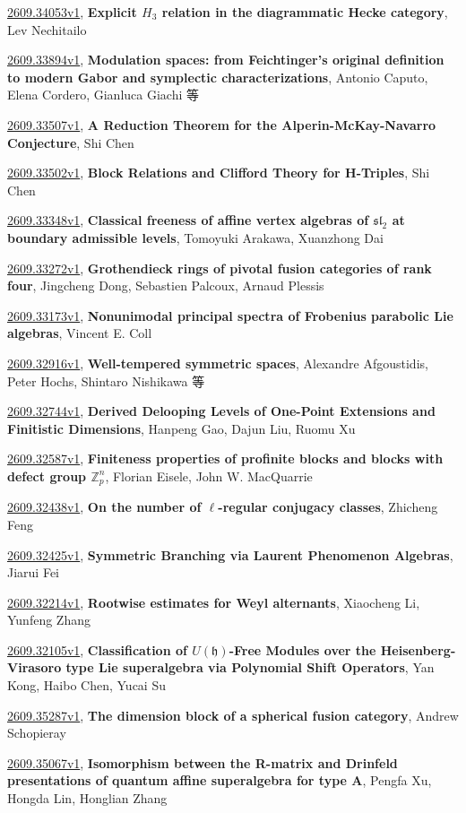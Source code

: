 \documentclass[9pt, a4paper]{article}
\theoremstyle{plain}
\theoremstyle{definition}
\theoremstyle{remark}
\newcommand{\arxiv}[3]{\href{https://arxiv.org/abs/#1}{#1}, \textbf{\textcolor{arxivblue}{#2}}, #3}
\begin{document}
\arxiv{2609.34053v1}{Explicit $H_3$ relation in the diagrammatic Hecke category}{Lev Nechitailo}

\arxiv{2609.33894v1}{Modulation spaces: from Feichtinger's original definition to modern Gabor and symplectic characterizations}{Antonio Caputo, Elena Cordero, Gianluca Giachi 等}

\arxiv{2609.33507v1}{A Reduction Theorem for the Alperin-McKay-Navarro Conjecture}{Shi Chen}

\arxiv{2609.33502v1}{Block Relations and Clifford Theory for H-Triples}{Shi Chen}

\arxiv{2609.33348v1}{Classical freeness of affine vertex algebras of $\mathfrak{sl}_2$ at boundary admissible levels}{Tomoyuki Arakawa, Xuanzhong Dai}

\arxiv{2609.33272v1}{Grothendieck rings of pivotal fusion categories of rank four}{Jingcheng Dong, Sebastien Palcoux, Arnaud Plessis}

\arxiv{2609.33173v1}{Nonunimodal principal spectra of Frobenius parabolic Lie algebras}{Vincent E. Coll}

\arxiv{2609.32916v1}{Well-tempered symmetric spaces}{Alexandre Afgoustidis, Peter Hochs, Shintaro Nishikawa 等}

\arxiv{2609.32744v1}{Derived Delooping Levels of One-Point Extensions and Finitistic Dimensions}{Hanpeng Gao, Dajun Liu, Ruomu Xu}

\arxiv{2609.32587v1}{Finiteness properties of profinite blocks and blocks with defect group $\mathbb Z_p^n$}{Florian Eisele, John W. MacQuarrie}

\arxiv{2609.32438v1}{On the number of $\ell$-regular conjugacy classes}{Zhicheng Feng}

\arxiv{2609.32425v1}{Symmetric Branching via Laurent Phenomenon Algebras}{Jiarui Fei}

\arxiv{2609.32214v1}{Rootwise estimates for Weyl alternants}{Xiaocheng Li, Yunfeng Zhang}

\arxiv{2609.32105v1}{Classification of \(U(\mathfrak h)\)-Free Modules over the Heisenberg-Virasoro type Lie superalgebra via Polynomial Shift Operators}{Yan Kong, Haibo Chen, Yucai Su}

\arxiv{2609.35287v1}{The dimension block of a spherical fusion category}{Andrew Schopieray}

\arxiv{2609.35067v1}{Isomorphism between the R-matrix and Drinfeld presentations of quantum affine superalgebra for type $\boldsymbol{A}$}{Pengfa Xu, Hongda Lin, Honglian Zhang}
\end{document}
